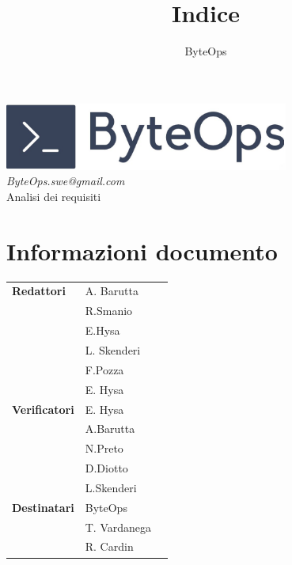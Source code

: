 \documentclass{article}
\title{\textbf{\fontsize{28}{6}\selectfont Indice}}
\author{\fontsize{14}{6}\selectfont ByteOps}
\date{}
\begin{document}

\pagestyle{fancy}
\begin{center}
    \includegraphics[width = 0.7\textwidth]{../Images/logo.png} \\
    \vspace{0.2cm}
    \textcolor[RGB]{60, 60, 60}{\textit{ByteOps.swe@gmail.com}} \\
    \vspace{1cm}
    \fontsize{16}{6}\selectfont Analisi dei requisiti\\
    \vspace{0.5cm}
\end{center}

\section*{Informazioni documento}
\def\arraystretch{1.2}
\begin{tabular}{>{\raggedleft\arraybackslash}p{}|>{\raggedright\arraybackslash}p{}c}
    \hline
    \addlinespace
    \textbf{Redattori}    & A. Barutta\\ & R.Smanio\\ & E.Hysa\\ & L. Skenderi\\ & F.Pozza\\ & E. Hysa \vspace{10pt} \\
    \textbf{Verificatori} & E. Hysa\\ & A.Barutta\\ & N.Preto\\ & D.Diotto\\ & L.Skenderi \vspace{10pt} \\
    \textbf{Destinatari}  & ByteOps\\ & T. Vardanega   \\ & R. Cardin \vspace{10pt} \\
\end{tabular}
\pagebreak
\end{document}
